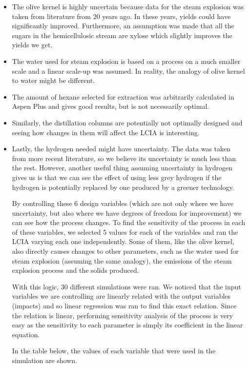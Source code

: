 \documentclass[11pt]{article}
\begin{document}
\begin{itemize}
\item The olive kernel is highly uncertain because data for the steam explosion was taken from literature from 20 years ago. In these years, yields could have significantly improved. Furthermore, an assumption was made that all the sugars in the hemicellulosic stream are xylose which slightly improves the yields we get.
\item The water used for steam explosion is based on a process on a much smaller scale and a linear scale-up was assumed. In reality, the analogy of olive kernel to water might be different.
\item The amount of hexane selected for extraction was arbitrarily calculated in Aspen Plus and gives good results, but is not necessarily optimal.
\item Similarly, the distillation columns are potentially not optimally designed and seeing how changes in them will affect the LCIA is interesting.
\item Lastly, the hydrogen needed might have uncertainty. The data was taken from more recent literature, so we believe its uncertainty is much less than the rest. However, another useful thing assuming uncertainty in hydrogen gives us is that we can see the effect of using less grey hydrogen if the hydrogen is potentially replaced by one produced by a greener technology.

By controlling these 6 design variables (which are not only where we have uncertainty, but also where we have degrees of freedom for improvement) we can see how the process changes. To find the sensitivity of the process in each of these variables, we selected 5 values for each of the variables and ran the LCIA varying each one independently. Some of them, like the olive kernel, also directly causes changes to other parameters, such as the water used for steam explosion (assuming the same analogy), the emissions of the steam explosion process and the solids produced.

With this logic, 30 different simulations were ran. We noticed that the input variables we are controlling are linearly related with the output variables (impacts) and so linear regression was ran to find this exact relation. Since the relation is linear, performing sensitivity analysis of the process is very easy as the sensitivity to each parameter is simply its coefficient in the linear equation.

In the table below, the values of each variable that were used in the simulation are shown.
\end{itemize}
\end{document}
